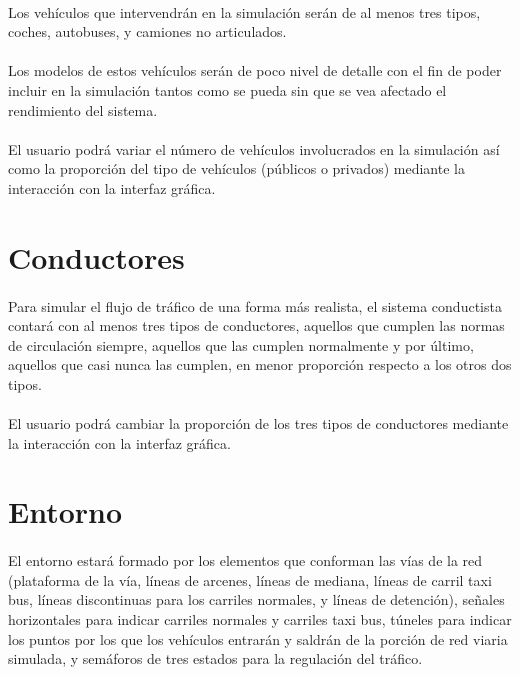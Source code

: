 	\paragraph{}
	Los vehículos que intervendrán en la simulación serán de al menos tres tipos, coches, autobuses, y camiones no articulados.
	
	\paragraph{}
	Los modelos de estos vehículos serán de poco nivel de detalle con el fin de poder incluir en la simulación tantos como se pueda sin que se vea afectado el rendimiento del sistema.
	
	\paragraph{}
	El usuario podrá variar el número de vehículos involucrados en la simulación así como la proporción del tipo de vehículos (públicos o privados) mediante la interacción con la interfaz gráfica.
	
\section{Conductores}

	\paragraph{}
	Para simular el flujo de tráfico de una forma más realista, el sistema conductista contará con al menos tres tipos de conductores, aquellos que cumplen las normas de circulación siempre, aquellos que las cumplen normalmente y por último, aquellos que casi nunca las cumplen, en menor proporción respecto a los otros dos tipos.
	
	\paragraph{}
	El usuario podrá cambiar la proporción de los tres tipos de conductores mediante la interacción con la interfaz gráfica.
	
\section{Entorno}
	
	\paragraph{}
	El entorno estará formado por los elementos que conforman las vías de la red (plataforma de la vía, líneas de arcenes, líneas de mediana, líneas de carril taxi bus, líneas discontinuas para los carriles normales, y líneas de detención), señales horizontales para indicar carriles normales y carriles taxi bus, túneles para indicar los puntos por los que los vehículos entrarán y saldrán de la porción de red viaria simulada, y semáforos de tres estados para la regulación del tráfico.
	